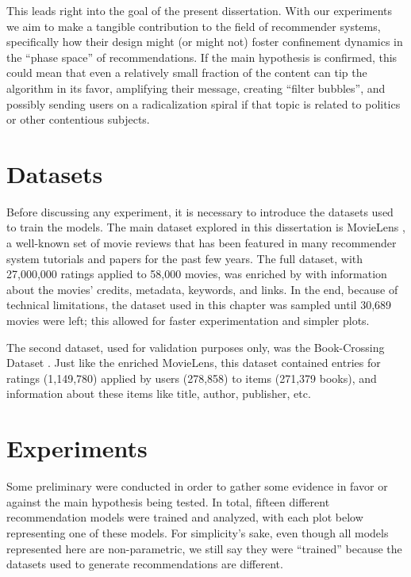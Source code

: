 This leads right into the goal of the present dissertation. With our experiments
we aim to make a tangible contribution to the field of recommender systems,
specifically how their design might (or might not) foster confinement dynamics
in the ``phase space'' of recommendations. If the main hypothesis is confirmed,
this could mean that even a relatively small fraction of the content can tip the
algorithm in its favor, amplifying their message, creating ``filter bubbles'',
and possibly sending users on a radicalization spiral if that topic is related
to politics or other contentious subjects.

\section{Datasets}
\label{sec:datasets03}

Before discussing any experiment, it is necessary to introduce the datasets used
to train the models. The main dataset explored in this dissertation is MovieLens
\citep{harper_movielens_2015}, a well-known set of movie reviews that has been
featured in many recommender system tutorials and papers for the past few years.
The full dataset, with 27,000,000 ratings applied to 58,000 movies, was enriched
by \citet{banik_movies_2017} with information about the movies' credits,
metadata, keywords, and links. In the end, because of technical limitations, the
dataset used in this chapter was sampled until 30,689 movies were left; this
allowed for faster experimentation and simpler plots.

The second dataset, used for validation purposes only, was the Book-Crossing
Dataset \citep{ziegler_book-crossing_2004}. Just like the enriched MovieLens,
this dataset contained entries for ratings (1,149,780) applied by users
(278,858) to items (271,379 books), and information about these items like
title, author, publisher, etc.

\section{Experiments}
\label{sec:experiments}

Some preliminary were conducted in order to gather some evidence in favor or
against the main hypothesis being tested. In total, fifteen different
recommendation models were trained and analyzed, with each plot below
representing one of these models. For simplicity's sake, even though all models
represented here are non-parametric, we still say they were ``trained'' because
the datasets used to generate recommendations are different.

